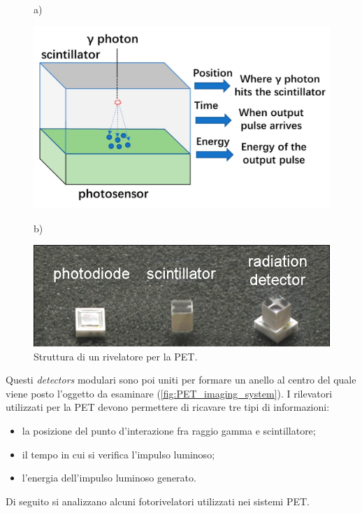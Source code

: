 \begin{figure}[tbh]
	\centering
	a)
	\begin{minipage}{.45\textwidth}
		\includegraphics[width=\linewidth]{./ImageFiles/PET_detectors.jpg}
	\end{minipage}
	b)
	\begin{minipage}{.45\textwidth}
		\includegraphics[width=\linewidth]{./ImageFiles/PET_detectors_real.jpg}
	\end{minipage}
	\caption{Struttura di un rivelatore per la PET\cite{Jiang2019}\cite{Spanoudaki2010}.}
	\label{fig:photodetectors}
\end{figure}
Questi \textit{detectors} modulari sono poi uniti per formare un anello al centro del quale viene posto l'oggetto da esaminare (\Fig\ref{fig:PET_imaging_system}). I rilevatori utilizzati per la PET devono permettere di ricavare tre tipi di informazioni:
\begin{itemize}
	\item la posizione del punto d'interazione fra raggio gamma e scintillatore;
	\item il tempo in cui si verifica l'impulso luminoso;
	\item l'energia dell'impulso luminoso generato.
\end{itemize}
Di seguito si analizzano alcuni fotorivelatori utilizzati nei sistemi PET.
\clearpage

